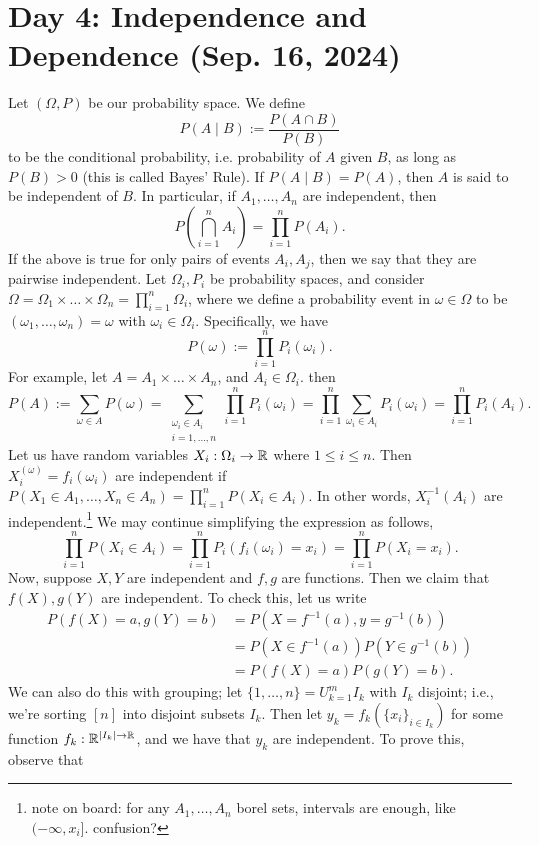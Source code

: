 \section{Day 4: Independence and Dependence (Sep. 16, 2024)}
Let $(\Omega, P)$ be our probability space. We define
\[ P (A \mid B) := \frac{P(A \cap B)}{P(B)} \]
to be the conditional probability, i.e. probability of $A$ given $B$, as long as $P(B) > 0$ (this is called Bayes' Rule). If $P(A \mid B) = P(A)$, then $A$ is said to be independent of $B$. In particular, if $A_1, \dots, A_n$ are independent, then
\[ P\left(\bigcap_{i = 1}^n A_i \right) = \prod_{i=1}^n P(A_i). \]
If the above is true for only pairs of events $A_i, A_j$, then we say that they are pairwise independent.
\medskip\newline
\noindent Let $\Omega_i, P_i$ be probability spaces, and consider $\Omega = \Omega_1 \times \dots \times \Omega_n = \prod_{i=1}^n \Omega_i$, where we define a probability event in $\omega \in \Omega$ to be $(\omega_1, \dots, \omega_n) = \omega$ with $\omega_i \in \Omega_i$. Specifically, we have
\[ P(\omega) := \prod_{i=1}^n P_i(\omega_i). \]
For example, let $A = A_1 \times \dots \times A_n$, and $A_i \in \Omega_i$. then
\[ P(A) := \sum_{\omega \in A} P(\omega) = \sum_{\substack{\omega_i \in A_i \\ i = 1, \dots, n}} \prod_{i=1}^n P_i(\omega_i) = \prod_{i=1}^n \sum_{\omega_i \in A_i} P_i(\omega_i) = \prod_{i=1}^n P_i(A_i). \]
Let us have random variables $X_i : \Omega_i \to \mathbb R$ where $1 \leq i \leq n$. Then $X_i^{(\omega)} = f_i(\omega_i)$ are independent if $P(X_1 \in A_1, \dots, X_n \in A_n) = \prod_{i=1}^n P(X_i \in A_i)$. In other words, $X_i^{-1}(A_i)$ are independent.\footnote{note on board: for any $A_1, \dots, A_n$ borel sets, intervals are enough, like $(-\infty, x_i]$. confusion?} We may continue simplifying the expression as follows,
\[ \prod_{i=1}^n P(X_i \in A_i) = \prod_{i=1}^n P_i(f_i(\omega_i) = x_i) = \prod_{i=1}^n P(X_i = x_i). \]
Now, suppose $X, Y$ are independent and $f, g$ are functions. Then we claim that $f(X), g(Y)$ are independent. To check this, let us write
\begin{align*}
    P(f(X) = a, g(Y) = b) &= P(X = f^{-1}(a), y = g^{-1}(b)) \\
    &= P(X \in f^{-1}(a)) P(Y \in g^{-1}(b)) \\
    &= P(f(X) = a) P(g(Y) = b).
\end{align*}
We can also do this with grouping; let $\{1, \dots, n\} = U_{k=1}^m I_k$ with $I_k$ disjoint; i.e., we're sorting $[n]$ into disjoint subsets $I_k$. Then let $y_k = f_k(\{x_i\}_{i \in I_k})$ for some function $f_k : \mathbb R^{\left\lvert I_k \right\rvert \to \mathbb R}$, and we have that $y_k$ are independent. To prove this, observe that
